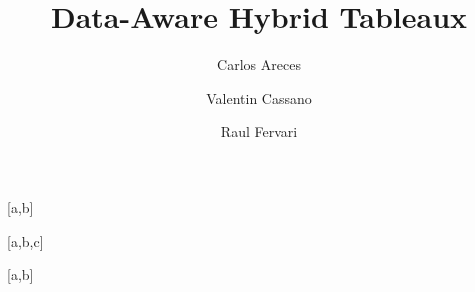 \documentclass{lmcs} %
\begin{document}
\title[Data-Aware Hybrid Tableaux]{Data-Aware Hybrid Tableaux}

\author[C.~Areces]{Carlos Areces}[a,b]
\author[V.~Cassano]{Valentin Cassano}[a,b,c]
\author[R.~Fervari]{Raul Fervari}[a,b]

\address{Universidad Nacional de C\'ordoba, Argentina}	%

\address{Consejo Nacional de Investigaciones Cient\'ificas y T\'ecnicas (CONICET), Argentina}	%

\address{Universidad Nacional de R\'io Cuarto, Argentina}









\end{document}
